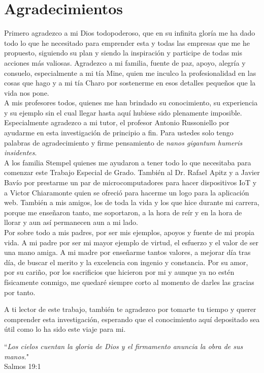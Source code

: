 \chapter*{Agradecimientos}
Primero agradezco a mi Dios todopoderoso, que en su infinita gloría me ha dado todo lo que he necesitado para emprender esta y todas las empresas que me he propuesto, siguiendo su plan y siendo la inspiración y participe de todas mis acciones más valiosas. Agradezco a mi familia, fuente de paz, apoyo, alegría y consuelo, especialmente a mi tía Mine, quien me inculco la profesionalidad en las cosas que hago y a mi tía Charo por sostenerme en esos detalles pequeños que la vida nos pone.\\

A mis profesores todos, quienes me han brindado su conocimiento, su experiencia y su ejemplo sin el cual llegar hasta aquí hubiese sido plenamente imposible. Especialmente agradezco a mi tutor, el profesor Antonio Russoniello por ayudarme en esta investigación de principio a fin. Para ustedes solo tengo palabras de agradecimiento y firme pensamiento de \textit{nanos gigantum humeris insidentes}.\\ 

A los familia Stempel quienes me ayudaron a tener todo lo que necesitaba para comenzar este Trabajo Especial de Grado. También al Dr. Rafael Apitz y a Javier Bavío por prestarme un par de microcomputadores para hacer dispositivos IoT y a Victor Chiaramonte quien se ofreció para hacerme un logo para la aplicación web. También a mis amigos, los de toda la vida y los que hice durante mi carrera, porque me enseñaron tanto, me soportaron, a la hora de reír y en la hora de llorar y aun así permanecen aun a mi lado.\\

Por sobre todo a mis padres, por ser mis ejemplos, apoyos y fuente de mi propia vida. A mi padre por ser mi mayor ejemplo de virtud, el esfuerzo y el valor de ser una mano amiga. A mi madre por enseñarme tantos valores, a mejorar día tras día, de buscar el merito y la excelencia con ingenio y constancia. Por su amor, por su cariño, por los sacrificios que hicieron por mi y aunque ya no estén físicamente conmigo, me quedaré siempre corto al momento de darles las gracias por tanto. 

A ti lector de este trabajo, también te agradezco por tomarte tu tiempo y querer comprender esta investigación, esperando que el conocimiento aquí depositado sea útil como lo ha sido este viaje para mi.\\

\vspace{35pt}
\begin{flushright}
``\textit{Los cielos cuentan la gloria de Dios y el firmamento anuncia la obra de sus manos.}"\\
Salmos 19:1
\end{flushright}





